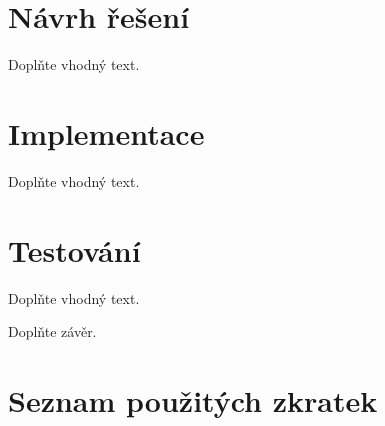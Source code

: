 \documentclass[thesis=M,czech]{FITthesis}[2012/10/20]
\begin{document}






\chapter{Návrh řešení}



Doplňte vhodný text.

\chapter{Implementace}

Doplňte vhodný text.

\chapter{Testování}

Doplňte vhodný text.


\begin{conclusion}
	Doplňte závěr.
	
\end{conclusion}




\appendix

\chapter{Seznam použitých zkratek}
\end{document}
